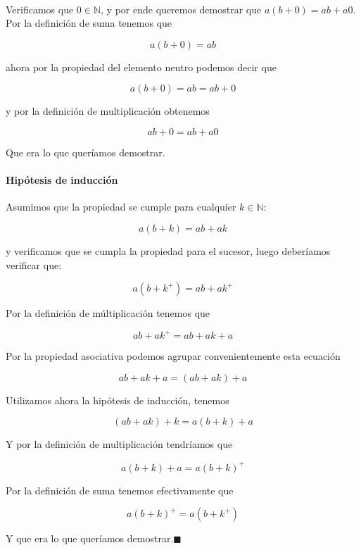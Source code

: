 \documentclass{article}
\begin{document}
\paragraph{} Verificamos que $0 \in \mathbb{N}$, y por ende queremos demostrar que $a(b + 0) = ab + a0$. Por la definición de suma tenemos que

	$$a(b + 0) = ab$$

ahora por la propiedad del elemento neutro podemos decir que

$$a(b + 0) = ab = ab + 0 $$

y por la definición de multiplicación obtenemos

$$ab + 0 = ab + a0$$

Que era lo que queríamos demostrar.

\paragraph{Hipótesis de inducción} Asumimos que la propiedad se cumple para cualquier $k \in \mathbb{N}$:

$$a(b + k) = ab + ak$$

y verificamos que se cumpla la propiedad para el sucesor, luego deberíamos verificar que:

$$a(b + k^+) = ab + ak^+$$

Por la definición de múltiplicación tenemos que

$$ab + ak^+ = ab + ak + a$$

Por la propiedad asociativa podemos agrupar convenientemente esta ecuación

$$ab + ak + a = (ab + ak) + a$$

Utilizamos ahora la hipótesis de inducción, tenemos

$$(ab + ak) + k = a(b + k) + a$$

Y por la definición de multiplicación tendríamos que 

$$a(b + k) + a = a(b + k)^+$$

Por la definición de suma tenemos efectivamente que 

$$a(b + k)^+ = a(b + k^+)$$

Y que era lo que queríamos demostrar.$\blacksquare$
\end{document}
